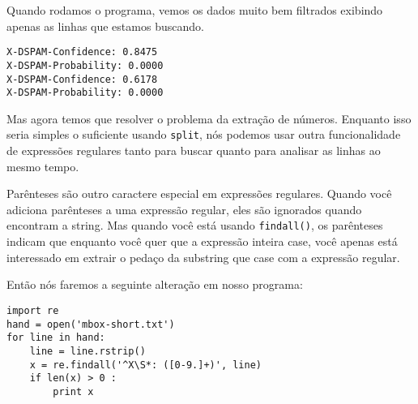 Quando rodamos o programa, vemos os dados muito bem filtrados exibindo 
apenas as linhas que estamos buscando. 

\beforeverb
\begin{verbatim}
X-DSPAM-Confidence: 0.8475
X-DSPAM-Probability: 0.0000
X-DSPAM-Confidence: 0.6178
X-DSPAM-Probability: 0.0000
\end{verbatim}
\afterverb
%

Mas agora temos que resolver o problema da extração de números. Enquanto isso seria simples o 
suficiente usando {\tt split}, nós podemos usar outra funcionalidade de expressões regulares 
tanto para buscar quanto para analisar as linhas ao mesmo tempo.


Parênteses são outro caractere especial em expressões regulares. Quando você adiciona parênteses 
a uma expressão regular, eles são ignorados quando encontram a string. Mas quando você está 
usando {\tt findall()}, os parênteses indicam que enquanto você quer que a expressão inteira 
case, você apenas está interessado em extrair o pedaço da substring que case com a expressão 
regular.


Então nós faremos a seguinte alteração em nosso programa:

\beforeverb
\begin{verbatim}
import re
hand = open('mbox-short.txt')
for line in hand:
    line = line.rstrip()
    x = re.findall('^X\S*: ([0-9.]+)', line)
    if len(x) > 0 :
        print x
\end{verbatim}
\afterverb
%

